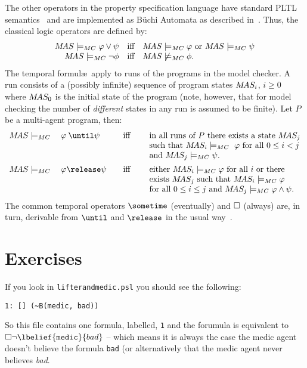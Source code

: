 \documentclass[a4]{article}
\begin{document}
\noindent The other operators in the \ajpf{} property specification
language have standard PLTL semantics~\cite{emerson:90a} and are
implemented as B\"{u}chi Automata as described
in~\cite{Gerth:1995:SOA:645837.670574,Courcoubetis92mea}. Thus, the
classical logic operators are defined by:
$$
\begin{array}{rcl}
  M\!AS \models_{MC} \varphi \vee \psi &\text{iff}& M\!AS \models_{MC}
  \varphi \text{ or } M\!AS \models_{MC} \psi \\
  M\!AS \models_{MC} \neg \phi &\text{iff}& M\!AS \not\models_{MC} \phi.
\end{array}
$$
The temporal formul\ae\ apply to runs of the programs in the \jpf{}
model checker. A run consists of a (possibly infinite) sequence of
program states $M\!AS_i$, $i \geq 0$ where $M\!AS_0$ is the initial
state of the program (note, however, that for model checking the
number of \emph{different} states in any run is assumed to be
finite). Let $P$ be a multi-agent program, then:
$$
\begin{array}{lcl}
  \MAS \models_{MC}\quad \varphi \: \until \psi 
   &\quad\text{iff}\quad&
    \text{ in all runs of $P$ there exists a state } \MAS_j\\
  &&  \text{ such that } \MAS_i \models_{MC}\ \varphi \text{ for all } 0 \leq i < j \\
  && \text{ and } \MAS_j \models_{MC} \psi{}.\\[.5em]
%
  \MAS \models_{MC}\quad\varphi \release \psi  
   &\quad\text{iff}\quad&
    \text{ either } \MAS_i \models_{MC} \varphi \text{ for all } i \text{ or there }\\
  && \text{ exists } \MAS_j \text{ such  that } \MAS_i \models_{MC} \varphi\\
  && \text{ for all } 0 \leq i \leq j \text{ and } \MAS_j \models_{MC} \varphi \land \psi{}.
\end{array}
$$
%
The common temporal operators $\sometime$ (eventually) and $\Box$
(always) are, in turn, derivable from $\until$ and $\release$ in the
usual way~\cite{emerson:90a}.

\section{Exercises}
If you look in \texttt{lifterandmedic.psl} you should see the following:
\begin{verbatim}
1: [] (~B(medic, bad))
\end{verbatim}
So this file contains one formula, labelled, \texttt{1} and the forumula is equivalent to $\always \neg \lbelief{\texttt{medic}}{bad}$ -- which means it is always the case the medic agent doesn't believe the formula \texttt{bad} (or alternatively that the medic agent never believes \emph{bad}.
\end{document}
